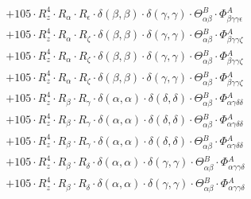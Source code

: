 \documentclass{article}
\begin{document}
\begin{subequations}
\begin{gather}
\begin{array}{c}
 \\[0.2em] 		 + 105 \cdot R_{z}^{4} \cdot R_{\alpha{}} \cdot R_{\epsilon{}} \cdot \delta{}\left(\beta{}, \beta{}\right) \cdot \delta{}\left(\gamma{}, \gamma{}\right) \cdot \Theta{}^{B}_{\alpha{}\beta{}} \cdot \Phi{}^{A}_{\beta{}\gamma{}\gamma{}\epsilon{}} 
 \\[0.2em] 		 + 105 \cdot R_{z}^{4} \cdot R_{\alpha{}} \cdot R_{\zeta{}} \cdot \delta{}\left(\beta{}, \beta{}\right) \cdot \delta{}\left(\gamma{}, \gamma{}\right) \cdot \Theta{}^{B}_{\alpha{}\beta{}} \cdot \Phi{}^{A}_{\beta{}\gamma{}\gamma{}\zeta{}} 
 \\[0.2em] 		 + 105 \cdot R_{z}^{4} \cdot R_{\alpha{}} \cdot R_{\zeta{}} \cdot \delta{}\left(\beta{}, \beta{}\right) \cdot \delta{}\left(\gamma{}, \gamma{}\right) \cdot \Theta{}^{B}_{\alpha{}\beta{}} \cdot \Phi{}^{A}_{\beta{}\gamma{}\gamma{}\zeta{}} 
 \\[0.2em] 		 + 105 \cdot R_{z}^{4} \cdot R_{\alpha{}} \cdot R_{\zeta{}} \cdot \delta{}\left(\beta{}, \beta{}\right) \cdot \delta{}\left(\gamma{}, \gamma{}\right) \cdot \Theta{}^{B}_{\alpha{}\beta{}} \cdot \Phi{}^{A}_{\beta{}\gamma{}\gamma{}\zeta{}} 
 \\[0.2em] 		 + 105 \cdot R_{z}^{4} \cdot R_{\beta{}} \cdot R_{\gamma{}} \cdot \delta{}\left(\alpha{}, \alpha{}\right) \cdot \delta{}\left(\delta{}, \delta{}\right) \cdot \Theta{}^{B}_{\alpha{}\beta{}} \cdot \Phi{}^{A}_{\alpha{}\gamma{}\delta{}\delta{}} 
 \\[0.2em] 		 + 105 \cdot R_{z}^{4} \cdot R_{\beta{}} \cdot R_{\gamma{}} \cdot \delta{}\left(\alpha{}, \alpha{}\right) \cdot \delta{}\left(\delta{}, \delta{}\right) \cdot \Theta{}^{B}_{\alpha{}\beta{}} \cdot \Phi{}^{A}_{\alpha{}\gamma{}\delta{}\delta{}} 
 \\[0.2em] 		 + 105 \cdot R_{z}^{4} \cdot R_{\beta{}} \cdot R_{\gamma{}} \cdot \delta{}\left(\alpha{}, \alpha{}\right) \cdot \delta{}\left(\delta{}, \delta{}\right) \cdot \Theta{}^{B}_{\alpha{}\beta{}} \cdot \Phi{}^{A}_{\alpha{}\gamma{}\delta{}\delta{}} 
 \\[0.2em] 		 + 105 \cdot R_{z}^{4} \cdot R_{\beta{}} \cdot R_{\delta{}} \cdot \delta{}\left(\alpha{}, \alpha{}\right) \cdot \delta{}\left(\gamma{}, \gamma{}\right) \cdot \Theta{}^{B}_{\alpha{}\beta{}} \cdot \Phi{}^{A}_{\alpha{}\gamma{}\gamma{}\delta{}} 
 \\[0.2em] 		 + 105 \cdot R_{z}^{4} \cdot R_{\beta{}} \cdot R_{\delta{}} \cdot \delta{}\left(\alpha{}, \alpha{}\right) \cdot \delta{}\left(\gamma{}, \gamma{}\right) \cdot \Theta{}^{B}_{\alpha{}\beta{}} \cdot \Phi{}^{A}_{\alpha{}\gamma{}\gamma{}\delta{}} 

\end{array}
\end{gather}
\end{subequations}
\end{document}
